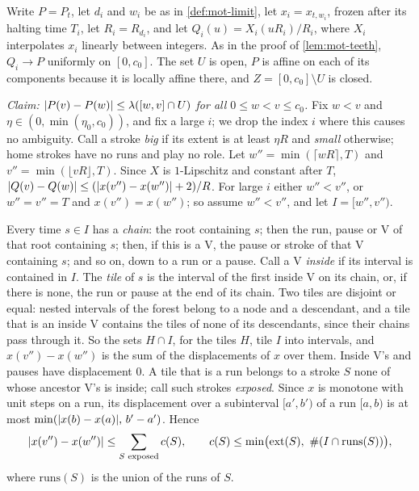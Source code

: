\begin{informalproof}
Write $P=P_t$, let $d_i$ and $w_i$ be as in \cref{def:mot-limit}, let $x_i=x_{t,w_i}$, frozen after its halting time
$T_i$, let $R_i=R_{d_i}$, and let $Q_i(u)=X_i(uR_i)/R_i$, where $X_i$ interpolates $x_i$ linearly between integers. As
in the proof of \cref{lem:mot-teeth}, $Q_i\to P$ uniformly on $[0,c_0]$. The set $U$ is open, $P$ is affine on each of
its components because it is locally affine there, and $Z=[0,c_0]\setminus U$ is closed.

\emph{Claim: $\lvert P(v)-P(w) \rvert\le\lambda([w,v]\cap U)$ for all $0\le w<v\le c_0$.} Fix $w<v$ and
$\eta\in(0,\min(\eta_0,c_0))$, and fix a large $i$; we drop the index $i$ where this causes no ambiguity. Call a stroke
\emph{big} if its extent is at least $\eta R$ and \emph{small} otherwise; home strokes have no runs and play no role. Let
$w''=\min(\lceil wR\rceil,T)$ and $v''=\min(\lfloor vR\rfloor,T)$. Since $X$ is $1$-Lipschitz and constant after $T$,
$\lvert Q(v)-Q(w) \rvert\le(\lvert x(v'')-x(w'') \rvert+2)/R$. For large $i$ either $w''<v''$, or $w''=v''=T$ and $x(v'')=x(w'')$; so
assume $w''<v''$, and let $I=[w'',v'')$.

Every time $s\in I$ has a \emph{chain}: the root containing $s$; then the run, pause or V of that root containing $s$;
then, if this is a V, the pause or stroke of that V containing $s$; and so on, down to a run or a pause. Call a V
\emph{inside} if its interval is contained in $I$. The \emph{tile} of $s$ is the interval of the first inside V on its
chain, or, if there is none, the run or pause at the end of its chain. Two tiles are disjoint or equal: nested intervals
of the forest belong to a node and a descendant, and a tile that is an inside V contains the tiles of none of its
descendants, since their chains pass through it. So the sets $H\cap I$, for the tiles $H$, tile $I$ into intervals, and
$x(v'')-x(w'')$ is the sum of the displacements of $x$ over them. Inside V's and pauses have displacement $0$. A tile
that is a run belongs to a stroke $S$ none of whose ancestor V's is inside; call such strokes \emph{exposed}. Since $x$ is
monotone with unit steps on a run, its displacement over a subinterval $[a',b')$ of a run $[a,b)$ is at most
$\min(\lvert x(b)-x(a) \rvert,\,b'-a')$. Hence
\[
  \abs{x(v'')-x(w'')}\le\sum_{S\text{ exposed}}c(S),\qquad
  c(S)\le\min\bigl(\operatorname{ext}(S),\ \#(I\cap\mathrm{runs}(S))\bigr),
\]
where $\mathrm{runs}(S)$ is the union of the runs of $S$.


\end{informalproof}
